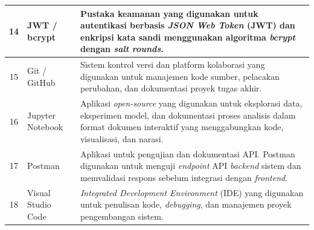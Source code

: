 \begin{longtable}{|c|p{2.5cm}|p{9cm}|}
14 & JWT / bcrypt & Pustaka keamanan yang digunakan untuk autentikasi berbasis \textit{JSON Web Token} (JWT) dan enkripsi kata sandi menggunakan algoritma \textit{bcrypt} dengan \textit{salt rounds}. \\
\hline

15 & Git / GitHub & Sistem kontrol versi dan platform kolaborasi yang digunakan untuk manajemen kode sumber, pelacakan perubahan, dan dokumentasi proyek tugas akhir. \\
\hline

16 & Jupyter Notebook & Aplikasi \textit{open-source} yang digunakan untuk eksplorasi data, eksperimen model, dan dokumentasi proses analisis dalam format dokumen interaktif yang menggabungkan kode, visualisasi, dan narasi. \\
\hline

17 & Postman & Aplikasi untuk pengujian dan dokumentasi API. Postman digunakan untuk menguji \textit{endpoint} API \textit{backend} sistem dan memvalidasi respons sebelum integrasi dengan \textit{frontend}. \\
\hline

18 & Visual Studio Code & \textit{Integrated Development Environment} (IDE) yang digunakan untuk penulisan kode, \textit{debugging}, dan manajemen proyek pengembangan sistem. \\
\hline

\end{longtable}
